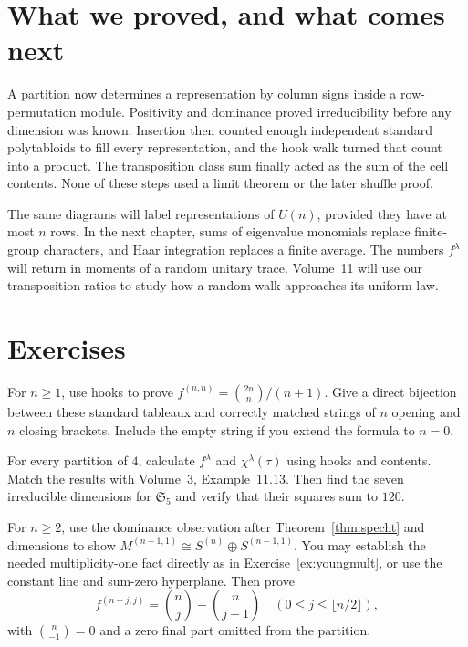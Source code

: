 \section{What we proved, and what comes next}

A partition now determines a representation by column signs inside a row-permutation module. Positivity and dominance proved irreducibility before any dimension was known. Insertion then counted enough independent standard polytabloids to fill every representation, and the hook walk turned that count into a product. The transposition class sum finally acted as the sum of the cell contents. None of these steps used a limit theorem or the later shuffle proof.

The same diagrams will label representations of $U(n)$, provided they have at most $n$ rows. In the next chapter, sums of eigenvalue monomials replace finite-group characters, and Haar integration replaces a finite average. The numbers $f^\lambda$ will return in moments of a random unitary trace. Volume~11 will use our transposition ratios to study how a random walk approaches its uniform law.

\section{Exercises}

\begin{exercise}[$\star$]\label{ex:catalan}
For $n\ge1$, use hooks to prove $f^{(n,n)}=\binom{2n}n/(n+1)$. Give a direct bijection between these standard tableaux and correctly matched strings of $n$ opening and $n$ closing brackets. Include the empty string if you extend the formula to $n=0$.
\end{exercise}

\begin{exercise}[$\star$]\label{ex:smalltables}
For every partition of $4$, calculate $f^\lambda$ and $\chi^\lambda(\tau)$ using hooks and contents. Match the results with Volume~3, Example~11.13. Then find the seven irreducible dimensions for $\mathfrak S_5$ and verify that their squares sum to $120$.
\end{exercise}

\begin{exercise}[$\star$]\label{ex:standardrep}
For $n\ge2$, use the dominance observation after Theorem~\ref{thm:specht} and dimensions to show
$M^{(n-1,1)}\cong S^{(n)}\oplus S^{(n-1,1)}$.
You may establish the needed multiplicity-one fact directly as in Exercise~\ref{ex:youngmult}, or use the constant line and sum-zero hyperplane. Then prove
\[
f^{(n-j,j)}=\binom nj-\binom n{j-1}
\quad(0\le j\le\lfloor n/2\rfloor),
\]
with $\binom n{-1}=0$ and a zero final part omitted from the partition.
\end{exercise}

